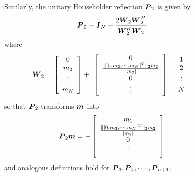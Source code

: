 \begin{figure}
{\begin{minipage} {140.0mm}
Similarly, the unitary Householder reflection
${\mbox{\boldmath$\mit P$\unboldmath}}_2$ is given by
\begin{equation} \label{P2def}
{\mbox{\boldmath$\mit P$\unboldmath}}_2\equiv {\mbox{\boldmath$\mit I$\unboldmath}}_N - \frac{2 {\mbox{\boldmath$\mit W$\unboldmath}}_{2} {\mbox{\boldmath$\mit W$\unboldmath}}_{2}^{H} 
}{{\mbox{\boldmath$\mit W$\unboldmath}}_{2}^{H}{\mbox{\boldmath$\mit W$\unboldmath}}_{2}}
\end{equation}
where 
\begin{equation} \label{W2def}
{\mbox{\boldmath$\mit W$\unboldmath}}_{2}=\left[ \begin{array}{c}0\\ m_2\\ \vdots\\ m_N \end{array} 
\right]+\begin{array}{cl}\left[ \begin{array}{c}0\\
\frac{\|[0, m_2,
\cdots, m_N]^{T}\|_{2} m_2}{|m_2|}\\ 0\\ \vdots \end{array} 
\right]&\begin{array}{c}1\\2\\ \vdots\\N \end{array} \end{array}
\end{equation}
so that ${\mbox{\boldmath$\mit P$\unboldmath}}_2$ transforms ${\mbox{\boldmath$\mit m$\unboldmath}}$ into
\[
{\mbox{\boldmath$\mit P$\unboldmath}}_2 {\mbox{\boldmath$\mit m$\unboldmath}}=-\left[ \begin{array}{c}
m_1\\ \frac{\|[0, m_2,
\cdots, m_N]^{T}\|_{2} m_2}{|m_2|}\\ 0\\ \vdots \end{array}\right]
\]
and analogous definitions hold for ${\mbox{\boldmath$\mit P$\unboldmath}}_3, {\mbox{\boldmath$\mit P$\unboldmath}}_4, \cdots, {\mbox{\boldmath$\mit P$\unboldmath}}_{n+1}$.


\vspace{6 mm}
\end{minipage}
}
\end{figure}


